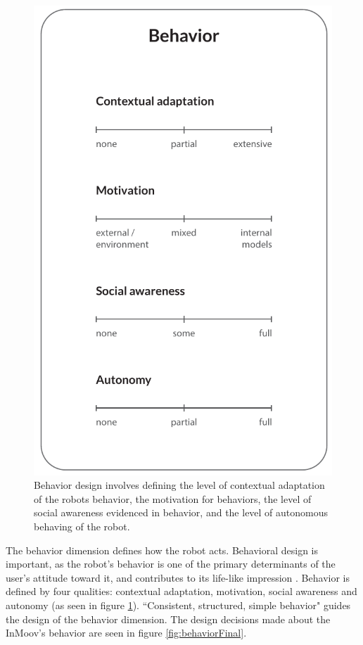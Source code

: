 \begin{figure}
\centering
  \includegraphics[scale=0.75]{images/solution_v4-05.pdf}
  \caption{Behavior design involves defining the level of contextual adaptation of the robots behavior, the motivation for behaviors, the level of social awareness evidenced in behavior, and the level of autonomous behaving of the robot.}
  \label{fig:behavior}
\end{figure}

The behavior dimension defines how the robot acts. Behavioral design is important, as the robot's behavior is one of the primary determinants of the user's attitude toward it, and contributes to its life-like impression \cite{designSpaces}. Behavior is defined by four qualities: contextual adaptation, motivation, social awareness and autonomy (as seen in figure \ref{fig:behavior}). ``Consistent, structured, simple behavior" guides the design of the behavior dimension. The design decisions made about the InMoov's behavior are seen in figure \ref{fig:behaviorFinal}.



